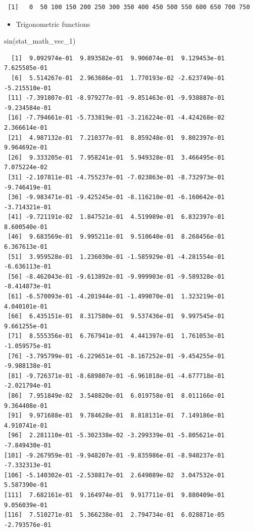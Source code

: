 \documentclass[
  letterpaper,
  DIV=11,
  numbers=noendperiod]{scrreprt}
\newenvironment{Shaded}{\begin{snugshade}}{\end{snugshade}}
\newcommand{\FunctionTok}[1]{\textcolor[rgb]{0.28,0.35,0.67}{#1}}
\newcommand{\NormalTok}[1]{\textcolor[rgb]{0.00,0.23,0.31}{#1}}
\providecommand{\tightlist}{%
  \setlength{\itemsep}{0pt}\setlength{\parskip}{0pt}}\usepackage{longtable,booktabs,array}
\begin{document}
\begin{verbatim}
 [1]   0  50 100 150 200 250 300 350 400 450 500 550 600 650 700 750
\end{verbatim}

\begin{itemize}
\tightlist
\item
  Trigonometric functions
\end{itemize}

\begin{Shaded}
\begin{Highlighting}[]
\FunctionTok{sin}\NormalTok{(stat\_math\_vec\_1)}
\end{Highlighting}
\end{Shaded}

\begin{verbatim}
  [1]  9.092974e-01  9.893582e-01  9.906074e-01  9.129453e-01  7.625585e-01
  [6]  5.514267e-01  2.963686e-01  1.770193e-02 -2.623749e-01 -5.215510e-01
 [11] -7.391807e-01 -8.979277e-01 -9.851463e-01 -9.938887e-01 -9.234584e-01
 [16] -7.794661e-01 -5.733819e-01 -3.216224e-01 -4.424268e-02  2.366614e-01
 [21]  4.987132e-01  7.210377e-01  8.859248e-01  9.802397e-01  9.964692e-01
 [26]  9.333205e-01  7.958241e-01  5.949328e-01  3.466495e-01  7.075224e-02
 [31] -2.107811e-01 -4.755237e-01 -7.023863e-01 -8.732973e-01 -9.746419e-01
 [36] -9.983471e-01 -9.425245e-01 -8.116210e-01 -6.160642e-01 -3.714321e-01
 [41] -9.721191e-02  1.847521e-01  4.519989e-01  6.832397e-01  8.600540e-01
 [46]  9.683569e-01  9.995211e-01  9.510640e-01  8.268456e-01  6.367613e-01
 [51]  3.959528e-01  1.236030e-01 -1.585929e-01 -4.281554e-01 -6.636113e-01
 [56] -8.462043e-01 -9.613892e-01 -9.999903e-01 -9.589328e-01 -8.414873e-01
 [61] -6.570093e-01 -4.201944e-01 -1.499070e-01  1.323219e-01  4.040101e-01
 [66]  6.435151e-01  8.317580e-01  9.537436e-01  9.997545e-01  9.661255e-01
 [71]  8.555356e-01  6.767941e-01  4.441397e-01  1.761053e-01 -1.059575e-01
 [76] -3.795799e-01 -6.229651e-01 -8.167252e-01 -9.454255e-01 -9.988138e-01
 [81] -9.726371e-01 -8.689807e-01 -6.961018e-01 -4.677718e-01 -2.021794e-01
 [86]  7.951849e-02  3.548820e-01  6.019758e-01  8.011166e-01  9.364408e-01
 [91]  9.971688e-01  9.784628e-01  8.818131e-01  7.149186e-01  4.910741e-01
 [96]  2.281110e-01 -5.302338e-02 -3.299339e-01 -5.805621e-01 -7.849430e-01
[101] -9.267959e-01 -9.948207e-01 -9.835986e-01 -8.940237e-01 -7.332313e-01
[106] -5.140302e-01 -2.538817e-01  2.649089e-02  3.047532e-01  5.587390e-01
[111]  7.682161e-01  9.164974e-01  9.917711e-01  9.880409e-01  9.056039e-01
[116]  7.510271e-01  5.366238e-01  2.794734e-01  6.028871e-05 -2.793576e-01
\end{verbatim}
\end{document}
